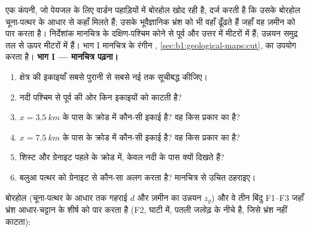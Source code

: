 \begin{problem}
\label{pb:b1:geological-maps:1}
एक कंपनी, जो पेयजल के लिए वार्डन पहाड़ियों में बोरहोल खोद रही है, दर्ज करती है कि उसके बोरहोल चूना-पत्थर
के आधार से कहाँ मिलते हैं; उसके भूवैज्ञानिक भ्रंश को भी वहाँ ढूँढते हैं जहाँ वह ज़मीन को पार करता है। निर्देशांक
मानचित्र के दक्षिण-पश्चिम कोने से पूर्व और उत्तर में मीटरों में हैं; उन्नयन समुद्र तल से ऊपर मीटरों में हैं। भाग I
मानचित्र के रंगीन , \cref{sec:b1:geological-maps:cut}, का उपयोग करता है।
\medskip
\noindent\textbf{भाग I --- मानचित्र पढ़ना।}
\begin{enumerate}
  \item क्षेत्र की इकाइयाँ सबसे पुरानी से सबसे नई तक सूचीबद्ध कीजिए।
  \item नदी पश्चिम से पूर्व की ओर किन इकाइयों को काटती है?
  \item $x = \qty{3.5}{km}$ के पास  के क्रोड में कौन-सी इकाई है? वह किस प्रकार का  है?
  \item $x = \qty{7.5}{km}$ के पास  के क्रोड में कौन-सी इकाई है? वह किस प्रकार का  है?
  \item शिस्ट और ग्रेनाइट पहले  के क्रोड में, केवल नदी के पास क्यों दिखते हैं?
  \item बलुआ पत्थर को ग्रेनाइट से कौन-सा  अलग करता है? मानचित्र से उचित ठहराइए।
\end{enumerate}

\medskip
\noindent बोरहोल (चूना-पत्थर के आधार तक गहराई $d$ और ज़मीन का उन्नयन $z_g$) और वे तीन बिंदु F1--F3 जहाँ भ्रंश
आधार-चट्टान के शीर्ष को पार करता है (F2, घाटी में, पतली जलोढ़ के नीचे है, जिसे भ्रंश नहीं काटता):


\end{problem}
